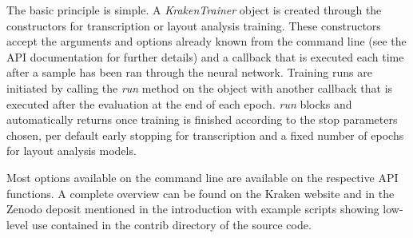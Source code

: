 The basic principle is simple. A \emph{KrakenTrainer} object is created through
the constructors for transcription or layout analysis training. These
constructors accept the arguments and options already known from the command
line (see the API documentation for further details) and a callback that is
executed each time after a sample has been ran through the neural network.
Training runs are initiated by calling the \emph{run} method on the object with
another callback that is executed after the evaluation at the end of each
epoch.  \emph{run} blocks and automatically returns once training is finished
according to the stop parameters chosen, per default early stopping for
transcription and a fixed number of epochs for layout analysis models.

Most options available on the command line are available on the respective API
functions. A complete overview can be found on the Kraken website and in the
Zenodo deposit mentioned in the introduction with example scripts showing
low-level use contained in the contrib directory of the source code.
